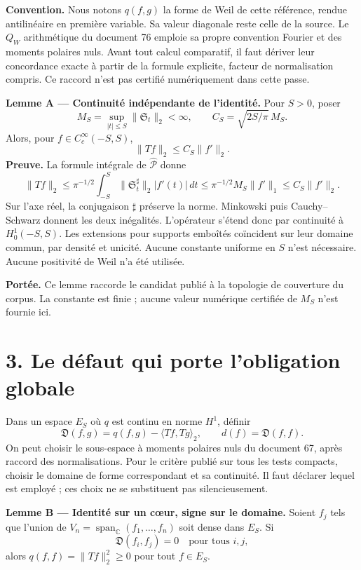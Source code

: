 \documentclass[
  11pt,
]{article}
\begin{document}
\textbf{Convention.} Nous notons \(q(f,g)\) la forme de Weil de cette
référence, rendue antilinéaire en première variable. Sa valeur diagonale
reste celle de la source. Le \(Q_W\) arithmétique du document 76 emploie
sa propre convention Fourier et des moments polaires nuls. Avant tout
calcul comparatif, il faut dériver leur concordance exacte à partir de
la formule explicite, facteur de normalisation compris. Ce raccord n'est
pas certifié numériquement dans cette passe.

\textbf{Lemme A --- Continuité indépendante de l'identité.} Pour
\(S>0\), poser \[
M_S=\sup_{|t|\le S}\|\mathfrak S_t\|_2<\infty,
\qquad C_S=\sqrt{2S/\pi}\,M_S.
\] Alors, pour \(f\in C_c^\infty(-S,S)\), \[
\boxed{\|Tf\|_2\le C_S\|f'\|_2.}
\] \textbf{Preuve.} La formule intégrale de \(\widehat{\mathcal P}\)
donne \[
\|Tf\|_2\le\pi^{-1/2}\int_{-S}^{S}
 \|\mathfrak S_t^\sharp\|_2|f'(t)|\,dt
\le\pi^{-1/2}M_S\|f'\|_1
\le C_S\|f'\|_2.
\] Sur l'axe réel, la conjugaison \(\sharp\) préserve la norme.
Minkowski puis Cauchy--Schwarz donnent les deux inégalités. L'opérateur
s'étend donc par continuité à \(H_0^1(-S,S)\). Les extensions pour
supports emboîtés coïncident sur leur domaine commun, par densité et
unicité. Aucune constante uniforme en \(S\) n'est nécessaire. Aucune
positivité de Weil n'a été utilisée.

\textbf{Portée.} Ce lemme raccorde le candidat publié à la topologie de
couverture du corpus. La constante est finie ; aucune valeur numérique
certifiée de \(M_S\) n'est fournie ici.

\hypertarget{le-duxe9faut-qui-porte-lobligation-globale}{%
\section{3. Le défaut qui porte l'obligation
globale}\label{le-duxe9faut-qui-porte-lobligation-globale}}

Dans un espace \(E_S\) où \(q\) est continu en norme \(H^1\), définir \[
\mathfrak D(f,g)=q(f,g)-\langle Tf,Tg\rangle_2,
\qquad d(f)=\mathfrak D(f,f).
\] On peut choisir le sous-espace à moments polaires nuls du document
67, après raccord des normalisations. Pour le critère publié sur tous
les tests compacts, choisir le domaine de forme correspondant et sa
continuité. Il faut déclarer lequel est employé ; ces choix ne se
substituent pas silencieusement.

\textbf{Lemme B --- Identité sur un cœur, signe sur le domaine.} Soient
\(f_j\) tels que l'union de
\(V_n=\operatorname{span}_{\mathbb C}(f_1,\ldots,f_n)\) soit dense dans
\(E_S\). Si \[
\mathfrak D(f_i,f_j)=0\quad\text{pour tous }i,j,
\] alors \(q(f,f)=\|Tf\|_2^2\ge0\) pour tout \(f\in E_S\).
\end{document}

